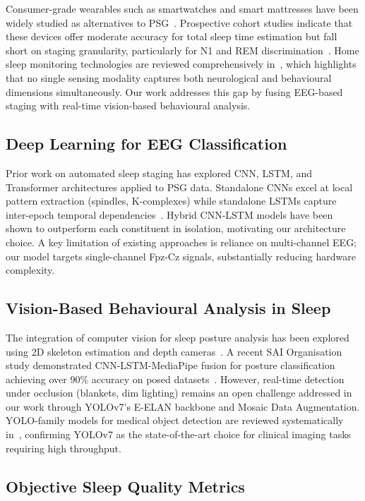 \documentclass[10pt, a4paper, twocolumn]{article}
\begin{document}
Consumer-grade wearables such as smartwatches and smart mattresses have been widely
studied as alternatives to PSG~\cite{ref10}. Prospective cohort studies indicate that
these devices offer moderate accuracy for total sleep time estimation but fall short
on staging granularity, particularly for N1 and REM discrimination~\cite{ref1}.
Home sleep monitoring technologies are reviewed comprehensively in~\cite{ref10}, which
highlights that no single sensing modality captures both neurological and behavioural
dimensions simultaneously. Our work addresses this gap by fusing EEG-based staging
with real-time vision-based behavioural analysis.

\subsection{Deep Learning for EEG Classification}

Prior work on automated sleep staging has explored CNN, LSTM, and Transformer
architectures applied to PSG data. Standalone CNNs excel at local pattern extraction
(spindles, K-complexes) while standalone LSTMs capture inter-epoch temporal
dependencies~\cite{ref2}. Hybrid CNN-LSTM models have been shown to outperform each
constituent in isolation, motivating our architecture choice. A key limitation of
existing approaches is reliance on multi-channel EEG; our model targets single-channel
Fpz-Cz signals, substantially reducing hardware complexity.

\subsection{Vision-Based Behavioural Analysis in Sleep}

The integration of computer vision for sleep posture analysis has been explored using
2D skeleton estimation and depth cameras~\cite{ref3}. A recent SAI Organisation study
demonstrated CNN-LSTM-MediaPipe fusion for posture classification achieving over 90\%
accuracy on posed datasets~\cite{ref3}. However, real-time detection under occlusion
(blankets, dim lighting) remains an open challenge addressed in our work through
YOLOv7's E-ELAN backbone and Mosaic Data Augmentation. YOLO-family models for medical
object detection are reviewed systematically in~\cite{ref9}, confirming YOLOv7 as the
state-of-the-art choice for clinical imaging tasks requiring high throughput.

\subsection{Objective Sleep Quality Metrics}
\end{document}
